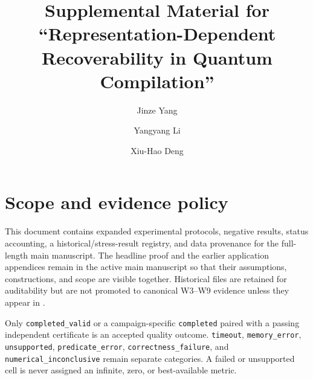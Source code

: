 \documentclass[a4paper,onecolumn,10pt,unpublished]{quantumarticle}
\begin{document}
\title{Supplemental Material for ``Representation-Dependent
Recoverability in Quantum Compilation''}
\author{Jinze Yang}
\author{Yangyang Li}
\author{Xiu-Hao Deng}
\date{}
\maketitle

\section{Scope and evidence policy}
\label{supp:scope}

This document contains expanded experimental protocols, negative results,
status accounting, a historical/stress-result registry, and data provenance
for the full-length main manuscript.  The headline proof and the earlier
application appendices remain in the active main manuscript so that their
assumptions, constructions, and scope are visible together.  Historical files
are retained for auditability but are not promoted to canonical W3--W9
evidence unless they appear in
.

\begin{sloppypar}
Only \texttt{completed\_valid} or a campaign-specific \texttt{completed}
paired with a passing independent certificate is an accepted quality outcome.
\texttt{timeout}, \texttt{memory\_error}, \texttt{unsupported},
\texttt{predicate\_error}, \texttt{correctness\_failure}, and
\texttt{numerical\_inconclusive} remain separate categories.  A failed or
unsupported cell is never assigned an infinite, zero, or best-available
metric.
\end{sloppypar}
\end{document}
